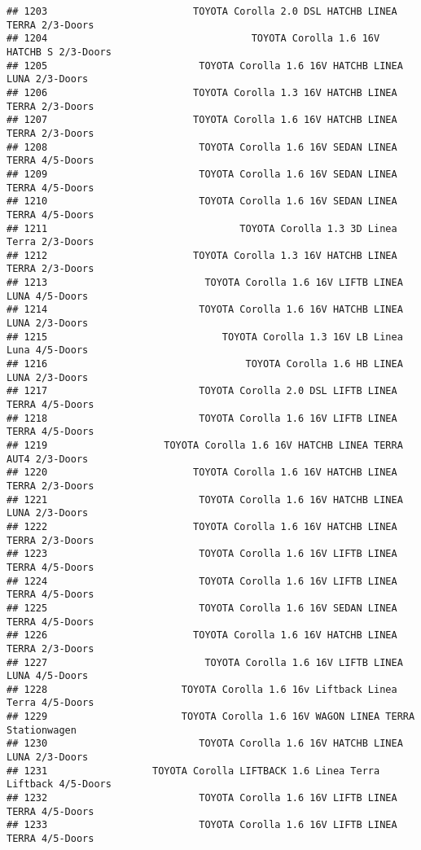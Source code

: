\documentclass[]{article}
\begin{document}
\begin{verbatim}
## 1203                         TOYOTA Corolla 2.0 DSL HATCHB LINEA TERRA 2/3-Doors
## 1204                                   TOYOTA Corolla 1.6 16V HATCHB S 2/3-Doors
## 1205                          TOYOTA Corolla 1.6 16V HATCHB LINEA LUNA 2/3-Doors
## 1206                         TOYOTA Corolla 1.3 16V HATCHB LINEA TERRA 2/3-Doors
## 1207                         TOYOTA Corolla 1.6 16V HATCHB LINEA TERRA 2/3-Doors
## 1208                          TOYOTA Corolla 1.6 16V SEDAN LINEA TERRA 4/5-Doors
## 1209                          TOYOTA Corolla 1.6 16V SEDAN LINEA TERRA 4/5-Doors
## 1210                          TOYOTA Corolla 1.6 16V SEDAN LINEA TERRA 4/5-Doors
## 1211                                 TOYOTA Corolla 1.3 3D Linea Terra 2/3-Doors
## 1212                         TOYOTA Corolla 1.3 16V HATCHB LINEA TERRA 2/3-Doors
## 1213                           TOYOTA Corolla 1.6 16V LIFTB LINEA LUNA 4/5-Doors
## 1214                          TOYOTA Corolla 1.6 16V HATCHB LINEA LUNA 2/3-Doors
## 1215                              TOYOTA Corolla 1.3 16V LB Linea Luna 4/5-Doors
## 1216                                  TOYOTA Corolla 1.6 HB LINEA LUNA 2/3-Doors
## 1217                          TOYOTA Corolla 2.0 DSL LIFTB LINEA TERRA 4/5-Doors
## 1218                          TOYOTA Corolla 1.6 16V LIFTB LINEA TERRA 4/5-Doors
## 1219                    TOYOTA Corolla 1.6 16V HATCHB LINEA TERRA AUT4 2/3-Doors
## 1220                         TOYOTA Corolla 1.6 16V HATCHB LINEA TERRA 2/3-Doors
## 1221                          TOYOTA Corolla 1.6 16V HATCHB LINEA LUNA 2/3-Doors
## 1222                         TOYOTA Corolla 1.6 16V HATCHB LINEA TERRA 2/3-Doors
## 1223                          TOYOTA Corolla 1.6 16V LIFTB LINEA TERRA 4/5-Doors
## 1224                          TOYOTA Corolla 1.6 16V LIFTB LINEA TERRA 4/5-Doors
## 1225                          TOYOTA Corolla 1.6 16V SEDAN LINEA TERRA 4/5-Doors
## 1226                         TOYOTA Corolla 1.6 16V HATCHB LINEA TERRA 2/3-Doors
## 1227                           TOYOTA Corolla 1.6 16V LIFTB LINEA LUNA 4/5-Doors
## 1228                       TOYOTA Corolla 1.6 16v Liftback Linea Terra 4/5-Doors
## 1229                       TOYOTA Corolla 1.6 16V WAGON LINEA TERRA Stationwagen
## 1230                          TOYOTA Corolla 1.6 16V HATCHB LINEA LUNA 2/3-Doors
## 1231                  TOYOTA Corolla LIFTBACK 1.6 Linea Terra Liftback 4/5-Doors
## 1232                          TOYOTA Corolla 1.6 16V LIFTB LINEA TERRA 4/5-Doors
## 1233                          TOYOTA Corolla 1.6 16V LIFTB LINEA TERRA 4/5-Doors

\end{verbatim}
\end{document}
